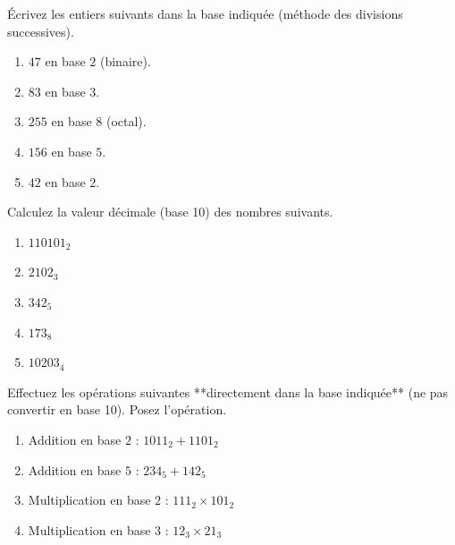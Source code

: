 \documentclass[11pt]{article}
\begin{document}
\begin{exercice}
Écrivez les entiers suivants dans la base indiquée (méthode des divisions successives).
\begin{enumerate}
    \item $47$ en base $2$ (binaire).
    \item $83$ en base $3$.
    \item $255$ en base $8$ (octal).
    \item $156$ en base $5$.
    \item $42$ en base $2$.
\end{enumerate}
\end{exercice}

\begin{exercice}
Calculez la valeur décimale (base 10) des nombres suivants.
\begin{enumerate}
    \item $110101_2$
    \item $2102_3$
    \item $342_5$
    \item $173_8$
    \item $10203_4$
\end{enumerate}
\end{exercice}

\begin{exercice}
Effectuez les opérations suivantes **directement dans la base indiquée** (ne pas convertir en base 10). Posez l'opération.
\begin{enumerate}
    \item Addition en base $2$ : $1011_2 + 1101_2$
    \item Addition en base $5$ : $234_5 + 142_5$
    \item Multiplication en base $2$ : $111_2 \times 101_2$
    \item Multiplication en base $3$ : $12_3 \times 21_3$
\end{enumerate}
\end{exercice}
\end{document}

